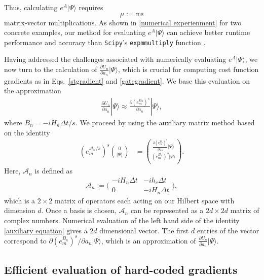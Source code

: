 \documentclass[letterpaper,10pt]{iopart}
\newcommand{\dket}[1]{|#1\rangle}
\begin{document}
Thus, calculating $e^A\dket{\Psi}$ requires
\begin{equation}
\label{mudefnition}
    \mu:=\mathbb{m}\mathbb{s}
\end{equation}
matrix-vector multiplications. As shown in   \ref{numerical experienment} for two concrete examples, our method for evaluating $e^A\dket{\Psi}$ can achieve better runtime performance and accuracy than \texttt{Scipy}'s \texttt{expm\textunderscore multiply} function \cite{al2011computing} .

Having addressed the challenges associated with numerically evaluating $e^A\dket{\Psi}$, we now turn to the calculation of $\frac{\partial U_n}{\partial a_n} \dket{\Psi}$, which is crucial for computing cost function gradients as in Eqs.\ \eqref{stgradient} and \eqref{gategradient}. We base this evaluation on the approximation 
\begin{align}
    \frac{\partial U_n}{\partial a_n} \dket{\Psi}\approx \frac{\partial (e^{B_n}_m)^s}{\partial a_n} \dket{\Psi},
\end{align}
where $B_n={-iH_n\Delta t}/{s}$. We proceed by using the auxiliary matrix method based on the identity \cite{auxigoodwin2015auxiliary,najfeld1995derivatives}
\begin{equation}
\label{auxiliary equation}
    \begin{aligned}
    (e^{\mathcal{A}_n/s}_m)^s
    \binom{0}{|\Psi\rangle}&=
    \binom{
    \frac{\partial (e^{B_{n}}_m)^s}{\partial a_n}  \dket{\Psi}}{{(e^{B_n}_m)^s|\Psi\rangle}}.
\end{aligned}
\end{equation}
Here, $\mathcal{A}_n$ is defined as
\begin{equation}
\mathcal{A}_n:=
{\biggl(\begin{matrix}
-iH_n \Delta t& -ih_c\Delta t \\
0 & -iH_n\Delta t
\end{matrix}\biggr)},
\end{equation}
which is a $2\times2$ matrix of operators each acting on our Hilbert space with dimension $d$. Once a basis is chosen, $\mathcal{A}_n$ can be represented as a $2d\times2d$ matrix of complex numbers. Numerical evaluation of the left hand side of the identity \eqref{auxiliary equation} gives a $2d$ dimensional vector. The first $d$ entries of the vector correspond to $\partial (e^{B_n}_m)^s / \partial a_n \dket{\Psi}$, which is an approximation of $\frac{\partial U_n}{\partial a_n} \dket{\Psi}$. 

\subsection{Efficient evaluation of hard-coded gradients}
\label{Computationally and memory efficient algorithm}
\end{document}
